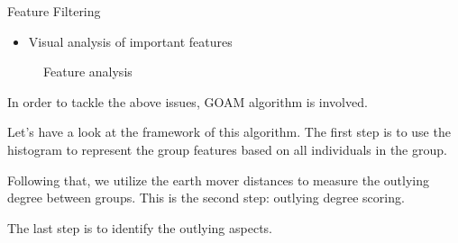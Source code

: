 \documentclass[
 size=14pt,
 paper=smartboard,  %
 mode=present, 		%
 display=slides, 	%
 style=tuliplab,  	%
 pauseslide,
 fleqn,leqno]{powerdot}
\begin{document}
\begin{slide}[toc=,bm=]{Feature Filtering}

\begin{itemize}
\item
Visual analysis of important features
\end{itemize}


\begin{figure}[htbp]
    \centering
    \caption{Feature analysis}
    \label{fig:fre-dis-each-feature}
\end{figure}


\begin{note}
In order to tackle the above issues,
GOAM algorithm is involved.

Let's have a look at the framework of this algorithm.
The first step is to use the histogram to represent the group features
based on all individuals in the group.

Following that,
we utilize the earth mover distances to measure the
outlying degree between groups.
This is the second step:
outlying degree scoring.

The last step is to identify the outlying aspects.

\end{note}

\end{slide}
\end{document}
